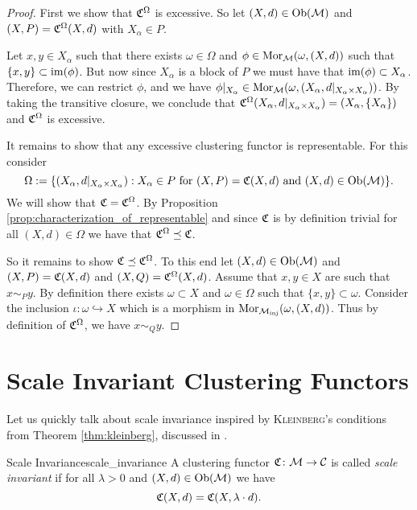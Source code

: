 \begin{proof}
First we show that $\mathfrak{C}^\Omega$ is excessive. So let $(X,d) \in \mathrm {Ob}(\mathcal{M})$ and $(X,P) = \mathfrak{C}^\Omega(X,d)$ with $X_\alpha \in P$.

Let $x,y \in X_\alpha$ such that there exists $\omega \in \Omega$ and $\phi \in \mathrm {Mor}_{\mathcal{M}}(\omega, (X,d))$ such that ${\{x,y\} \subset \operatorname*{im}(\phi)}$. But now since $X_\alpha$ is a block of $P$ we must have that $\operatorname*{im}(\phi) \subset X_\alpha$. Therefore, we can restrict $\phi$, and we have $\phi|_{X_\alpha} \in \mathrm {Mor}_{\mathcal{M}}(\omega, (X_\alpha, d|_{X_\alpha \times X_\alpha}))$. By taking the transitive closure, we conclude that $\mathfrak{C}^\Omega(X_\alpha, d|_{X_\alpha \times X_\alpha}) = (X_\alpha, \{X_\alpha\})$ and $\mathfrak{C}^\Omega$ is excessive.

It remains to show that any excessive clustering functor is representable. For this consider
$$
\Omega := \{(X_\alpha, d|_{X_\alpha \times X_\alpha}): X_\alpha \in P \text{ for } (X, P) = \mathfrak{C}(X,d) \text{ and } (X,d) \in \mathrm {Ob}(\mathcal{M})\}.
$$
We will show that $\mathfrak{C} = \mathfrak{C}^\Omega$. By Proposition \ref{prop:characterization_of_representable} and since $\mathfrak{C}$ is by definition trivial for all $(X,d) \in \Omega$ we have that $\mathfrak{C}^\Omega \preceq \mathfrak{C}$.

So it remains to show $\mathfrak{C} \preceq \mathfrak{C}^\Omega$. To this end let $(X,d) \in \mathrm {Ob}(\mathcal{M})$ and $(X,P) = \mathfrak{C}(X,d)$ and $(X,Q) = \mathfrak{C}^\Omega(X,d)$.
Assume that $x,y \in X$ are such that $x \sim_P y$. By definition there exists $\omega \subset X$ and $\omega \in \Omega$ such that $\{x,y\} \subset \omega$. Consider the inclusion $\iota: \omega \hookrightarrow X$ which is a morphism in $\mathrm {Mor}_{\mathcal{M}_\mathrm{inj}}(\omega, (X,d))$. Thus by definition of $\mathfrak{C}^\Omega$, we have $x \sim_Q y$.
\end{proof}


\section{Scale Invariant Clustering Functors}
Let us quickly talk about scale invariance inspired by \textsc{Kleinberg}'s conditions from Theorem \ref{thm:kleinberg}, discussed in \cite[Sec.~6.6]{Carlsson2010}.

\begin{definition}{Scale Invariance}{scale_invariance}
    A clustering functor $\mathfrak{C}\colon \mathcal{M} \to \mathcal{C}$ is called \emph{scale invariant} if for all $\lambda > 0$ and $(X,d) \in \mathrm {Ob}(\mathcal{M})$ we have
    \begin{equation*}
        \mathfrak{C}(X,d) = \mathfrak{C}(X,\lambda \cdot d).
    \end{equation*}
\end{definition}

